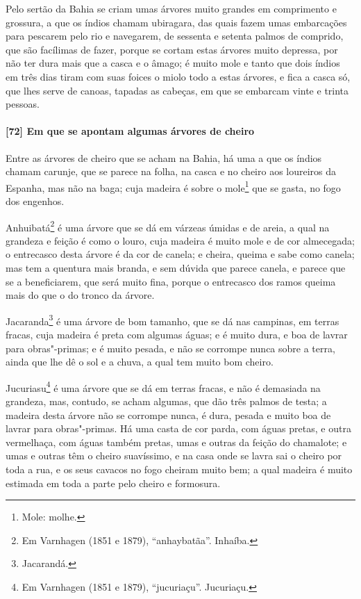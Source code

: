 Pelo sertão da Bahia se criam umas árvores muito grandes em comprimento e grossura, a que
os índios chamam ubiragara, das quais fazem umas embarcações para pescarem pelo rio e
navegarem, de sessenta e setenta palmos de comprido, que são facílimas de fazer, porque se
cortam estas árvores muito depressa, por não ter dura mais que a casca e o âmago; é muito
mole e tanto que dois índios em três dias tiram com suas foices o miolo todo a estas
árvores, e fica a casca só, que lhes serve de canoas, tapadas as cabeças, em que se
embarcam vinte e trinta pessoas.

\paragraph{[72] Em que se apontam algumas árvores de cheiro}\quad
Entre as árvores de cheiro que se acham na Bahia, há uma a que os índios chamam carunje,
que se parece na folha, na casca e no cheiro aos loureiros da Espanha, mas não na baga;
cuja madeira é sobre o mole\footnote{ Mole: molhe.} que se gasta, no fogo dos engenhos.


Anhuibatá\footnote{ Em Varnhagen (1851 e 1879), ``anhaybatãa''. Inhaíba.} é uma árvore que
se dá em várzeas úmidas e de areia, a qual na grandeza e feição é como o louro, cuja
madeira é muito mole e de cor almecegada; o entrecasco desta árvore é da cor de canela; e
cheira, queima e sabe como canela; mas tem a quentura mais branda, e sem dúvida que parece
canela, e parece que se a beneficiarem, que será muito fina, porque o entrecasco dos ramos
queima mais do que o do tronco da árvore.

Jacaranda\footnote{ Jacarandá.} é uma árvore de bom tamanho, que se dá nas campinas, em
terras fracas, cuja madeira é preta com algumas águas; e é muito dura, e boa de lavrar
para obras"-primas; e é muito pesada, e não se corrompe nunca sobre a terra, ainda que lhe
dê o sol e a chuva, a qual tem muito bom cheiro.

Jucuriasu\footnote{ Em Varnhagen (1851 e 1879), ``jucuriaçu''. Jucuriaçu.} é uma árvore
que se dá em terras fracas, e não é demasiada na grandeza, mas, contudo, se acham algumas,
que dão três palmos de testa; a madeira desta árvore não se corrompe nunca, é dura, pesada
e muito boa de lavrar para obras"-primas. Há uma casta de cor parda, com águas pretas, e
outra vermelhaça, com águas também pretas, umas e outras da feição do chamalote; e umas e
outras têm o cheiro suavíssimo, e na casa onde se lavra sai o cheiro por toda a rua, e os
seus cavacos no fogo cheiram muito bem; a qual madeira é muito estimada em toda a parte
pelo cheiro e formosura.

